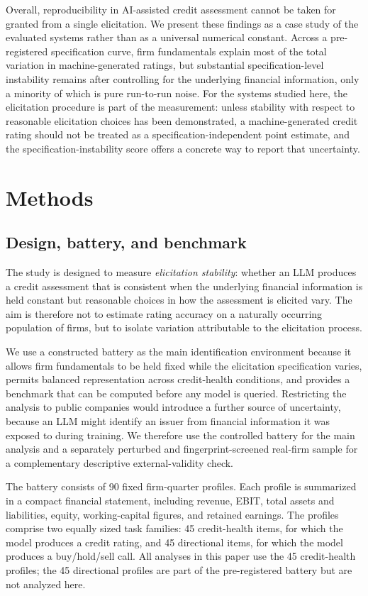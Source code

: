 \documentclass[a4paper,fleqn]{cas-sc}
\begin{document}
Overall, reproducibility in AI-assisted credit assessment cannot be taken for granted from a single
elicitation. We present these findings as a case study of the evaluated systems rather than as a universal
numerical constant. Across a pre-registered specification curve, firm fundamentals explain most of the total
variation in machine-generated ratings, but substantial specification-level instability remains after
controlling for the underlying financial information, only a minority of which is pure run-to-run noise.
For the systems studied here, the elicitation procedure is part of the measurement: unless stability with
respect to reasonable elicitation choices has been demonstrated, a machine-generated credit rating should
not be treated as a specification-independent point estimate, and the specification-instability score offers
a concrete way to report that uncertainty.

\section{Methods}
\subsection{Design, battery, and benchmark}
The study is designed to measure \emph{elicitation stability}: whether an LLM produces a credit
assessment that is consistent when the underlying financial information is held constant but reasonable
choices in how the assessment is elicited vary. The aim is therefore not to estimate rating accuracy on a
naturally occurring population of firms, but to isolate variation attributable to the elicitation
process.

We use a constructed battery as the main identification environment because it allows firm fundamentals
to be held fixed while the elicitation specification varies, permits balanced representation across
credit-health conditions, and provides a benchmark that can be computed before any model is queried.
Restricting the analysis to public companies would introduce a further source of uncertainty,
because an LLM might identify an issuer from financial information it was exposed to during training. We
therefore use the controlled battery for the main analysis and a separately perturbed and fingerprint-screened real-firm
sample for a complementary descriptive external-validity check.

The battery consists of 90 fixed firm-quarter profiles. Each profile is summarized in a compact financial
statement, including revenue, EBIT, total assets and liabilities, equity, working-capital figures, and
retained earnings. The profiles comprise two equally sized task families: 45 credit-health items, for
which the model produces a credit rating, and 45 directional items, for which the model produces a
buy/hold/sell call. All analyses in this paper use the 45 credit-health profiles; the 45 directional
profiles are part of the pre-registered battery but are not analyzed here.
\end{document}
